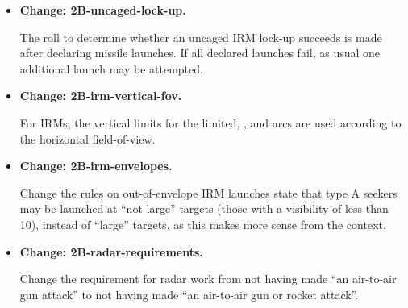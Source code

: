 \documentclass{report}
\newcommand{\changetag}[1]{\textbf{Change: #1.}\par}
\begin{document}
\begin{itemize}
    \item\changetag{2B-uncaged-lock-up}

        The roll to determine whether an uncaged IRM lock-up succeeds is made after declaring missile launches. If all declared launches fail, as usual one additional launch may be attempted.

    \item\changetag{2B-irm-vertical-fov}

        For IRMs, the vertical limits for the limited, , and  arcs are used according to the horizontal field-of-view.

    \item\changetag{2B-irm-envelopes}

        Change the rules on out-of-envelope IRM launches state that type A seekers may be launched at “not large” targets (those with a visibility of less than 10), instead of “large” targets, as this makes more sense from the context.

    \item\changetag{2B-radar-requirements}

        Change the requirement for radar work from not having made “an air-to-air gun attack” to not having made “an air-to-air gun or rocket attack”.








\end{itemize}
\end{document}
